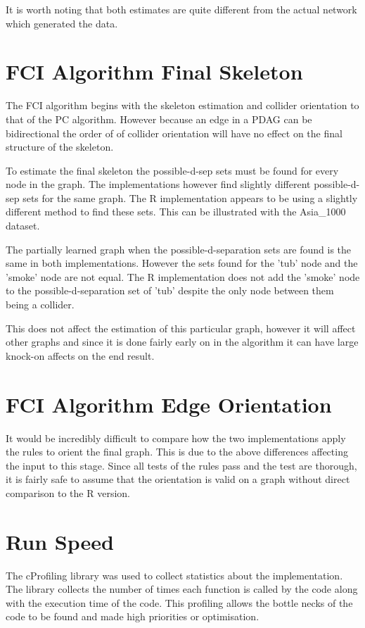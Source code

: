 \documentclass{UoYCSproject}
\begin{document}
It is worth noting that both estimates are quite different from the actual network which generated the data.

\section{FCI Algorithm Final Skeleton}
The FCI algorithm begins with the skeleton estimation and collider orientation to that of the PC algorithm. However because an edge in a PDAG can be bidirectional the order of of collider orientation will have no effect on the final structure of the skeleton.

To estimate the final skeleton the possible-d-sep sets must be found for every node in the graph. The implementations however find slightly different possible-d-sep sets for the same graph. The R implementation appears to be using a slightly different method to find these sets. This can be illustrated with the Asia\_1000 dataset.

The partially learned graph when the possible-d-separation sets are found is the same in both implementations. However the sets found for the 'tub' node and the 'smoke' node are not equal. The R implementation does not add the 'smoke' node to the possible-d-separation set of 'tub' despite the only node between them being a collider. 

This does not affect the estimation of this particular graph, however it will affect other graphs and since it is done fairly early on in the algorithm it can have large knock-on affects on the end result.

\section{FCI Algorithm Edge Orientation}

It would be incredibly difficult to compare how the two implementations apply the rules to orient the final graph. This is due to the above differences affecting the input to this stage. Since all tests of the rules pass and the test are thorough, it is fairly safe to assume that the orientation is valid on a graph without direct comparison to the R version.

\section{Run Speed}
The cProfiling library was used to collect statistics about the implementation. The library collects the number of times each function is called by the code along with the execution time of the code. This profiling allows the bottle necks of the code to be found and made high priorities or optimisation.
\end{document}
